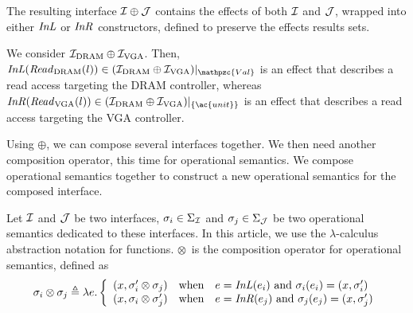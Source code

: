 The resulting interface $\mathcal{I} \oplus \mathcal{J}$ contains the effects of both $\mathcal{I}$ and
$\mathcal{J}$, wrapped into either $\mathit{InL}$ or $\mathit{InR}$ constructors, defined to
preserve the effects results sets. 
%

\begin{example}
  We consider $\mathcal{I}_{\mathrm{DRAM}} \oplus \mathcal{I}_{\mathrm{VGA}}$. Then,
  $\func{InL}(\func{Read}_{\mathrm{DRAM}}(l)) \in \Interface{(\I_{\mathrm{DRAM}}
    \oplus \I_{\mathrm{VGA}})}{\mathpzc{Val}}$ is an effect that describes a
  read access targeting the DRAM controller, whereas
  $\func{InR}(\func{Read}_{\mathrm{VGA}}(l)) \in \Interface{(\I_{\mathrm{DRAM}}
    \oplus \I_{\mathrm{VGA}})}{\{\ac{unit}\}}$ is an effect that describes a
  read access targeting the VGA controller. 
\end{example}

Using $\oplus$, we can compose several interfaces together.
%
We then need another composition operator, this time for operational semantics.
%
We compose operational semantics together to construct a new operational
semantics for the composed interface.

\begin{definition} \label{def:freespec:semantics-composition} Let $\mathcal{I}$ and $\mathcal{J}$ be
  two interfaces, $\sigma_i \in \Sigma_{\mathcal{I}}$ and $\sigma_j \in \Sigma_{\mathcal{J}}$ be
  two operational semantics dedicated to these interfaces.
  In this article, we use the $\lambda$-calculus abstraction notation for
  functions. 
  $\otimes$~is the composition operator for operational semantics, defined as
  \[ \sigma_i \otimes \sigma_j \triangleq \lambda e. \left \{
      \begin{array}{lcl}
        (x, \sigma_i' \otimes \sigma_j) & \text{when} & e =
                                                        \mathit{InL}(e_i)
                                                        \text{ and }
                                                        \sigma_i(e_i)
                                                        = (x,
                                                        \sigma_i') \\
        (x, \sigma_i \otimes \sigma_j') & \text{when} & e =
                                                        \mathit{InR}(e_j)
                                                        \text{ and }
                                                        \sigma_j(e_j)
                                                        = (x, \sigma_j')
      \end{array}
    \right.
  \]
\end{definition}

